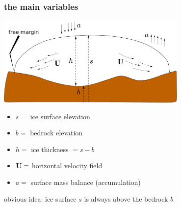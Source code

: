 \documentclass[hide notes,intlimits]{beamer}
\begin{document}
\begin{frame}
  \frametitle{the main variables}

\begin{center}
\includegraphics[width=0.7\textwidth]{groundedscheme}
\end{center}

\begin{itemize}
\small
\item $s=$ ice surface elevation
\item $b=$ bedrock elevation
\item $h=$ ice thickness $ = s-b$
\item ${\bf U}=$ horizontal velocity field
\item $a=$ surface mass balance (accumulation)
\end{itemize}

\begin{alertblock}{obvious idea: ice surface $s$ is always above the bedrock $b$}
\end{alertblock}
\end{frame}
\end{document}
